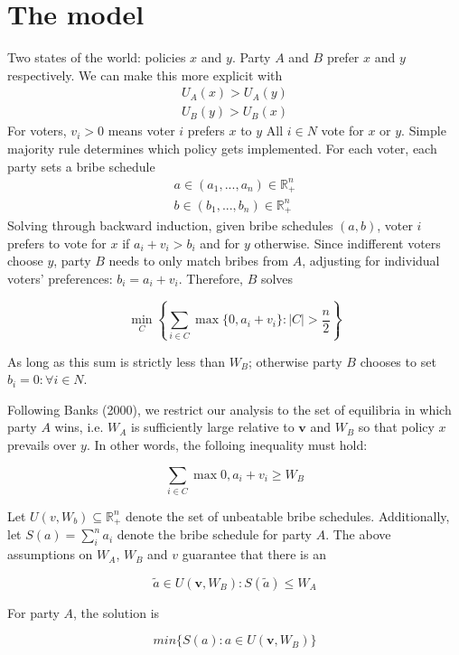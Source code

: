 \documentclass[12pt,a4paper]{article}
\begin{document}
\section{The model}

Two states of the world: policies $x$ and $y$. Party $A$ and $B$ prefer $x$ and $y$ respectively. We can make this more explicit with
\begin{align*}
    U_A(x) > U_A(y)\\
    U_B(y) > U_B(x)
\end{align*}
For voters, $v_i > 0$ means voter $i$ prefers $x$ to $y$ All $i \in N$ vote for $x$ or $y$. Simple majority rule determines which policy gets implemented. For each voter, each party sets a bribe schedule
\begin{align*}
    a \in (a_1, ..., a_n) \in \mathbb{R}^n_+\\
    b \in (b_1, ..., b_n) \in \mathbb{R}^n_+
\end{align*}
Solving through backward induction, given bribe schedules $(a,b)$, voter $i$ prefers to vote for $x$ if $a_i + v_i > b_i$ and for $y$ otherwise. Since indifferent voters choose $y$, party $B$ needs to only match bribes from $A$, adjusting for individual voters' preferences: $b_i = a_i + v_i$. Therefore, $B$ solves

$$\min_C \left\{\sum_{i \in C} \max\{0, a_i + v_i\} : |C| > \frac{n}{2} \right\}$$

As long as this sum is strictly less than $W_B$; otherwise party $B$ chooses to set $b_i = 0 : \forall i \in N$.

Following Banks (2000), we restrict our analysis to the set of equilibria in which party $A$ wins, i.e. $W_A$ is sufficiently large relative to $\mathbf{v}$ and $W_B$ so that policy $x$ prevails over $y$. In other words, the folloing inequality must hold:

$$ \sum_{i \in C} \max{0, a_i + v_i} \geq W_B$$

Let $U(v, W_b) \subseteq \mathbb{R}^n_+$ denote the set of unbeatable bribe schedules. Additionally, let $S(a) = \sum^n_i a_i$ denote the bribe schedule for party $A$. The above assumptions on $W_A$, $W_B$ and $v$ guarantee that there is an

$$\tilde{a} \in U(\mathbf{v}, W_B) : S(\tilde{a}) \leq W_A$$

For party $A$, the solution is

\begin{equation}
\label{eqn:solution}
min\{S(a) : a \in U(\mathbf{v}, W_B) \}
\end{equation}
\end{document}

